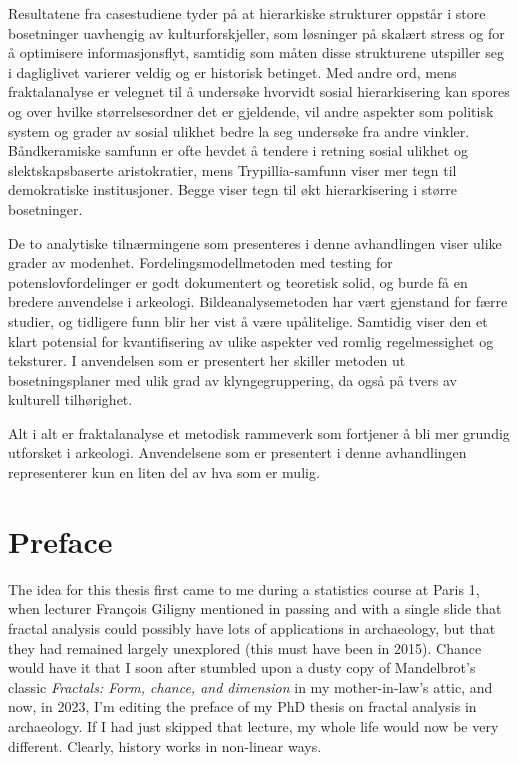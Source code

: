 \documentclass[
  12pt,
  a4paper, twoside]{book}
\begin{document}
Resultatene fra casestudiene tyder på at hierarkiske strukturer oppstår i store bosetninger uavhengig av kulturforskjeller, som løsninger på skalært stress og for å optimisere informasjonsflyt, samtidig som måten disse strukturene utspiller seg i dagliglivet varierer veldig og er historisk betinget. Med andre ord, mens fraktalanalyse er velegnet til å undersøke hvorvidt sosial hierarkisering kan spores og over hvilke størrelsesordner det er gjeldende, vil andre aspekter som politisk system og grader av sosial ulikhet bedre la seg undersøke fra andre vinkler. Båndkeramiske samfunn er ofte hevdet å tendere i retning sosial ulikhet og slektskapsbaserte aristokratier, mens Trypillia-samfunn viser mer tegn til demokratiske institusjoner. Begge viser tegn til økt hierarkisering i større bosetninger.

De to analytiske tilnærmingene som presenteres i denne avhandlingen viser ulike grader av modenhet. Fordelingsmodellmetoden med testing for potenslovfordelinger er godt dokumentert og teoretisk solid, og burde få en bredere anvendelse i arkeologi. Bildeanalysemetoden har vært gjenstand for færre studier, og tidligere funn blir her vist å være upålitelige. Samtidig viser den et klart potensial for kvantifisering av ulike aspekter ved romlig regelmessighet og teksturer. I anvendelsen som er presentert her skiller metoden ut bosetningsplaner med ulik grad av klyngegruppering, da også på tvers av kulturell tilhørighet.

Alt i alt er fraktalanalyse et metodisk rammeverk som fortjener å bli mer grundig utforsket i arkeologi. Anvendelsene som er presentert i denne avhandlingen representerer kun en liten del av hva som er mulig.

\hypertarget{preface}{%
\chapter*{Preface}\label{preface}}

The idea for this thesis first came to me during a statistics course at Paris 1, when lecturer François Giligny mentioned in passing and with a single slide that fractal analysis could possibly have lots of applications in archaeology, but that they had remained largely unexplored (this must have been in 2015). Chance would have it that I soon after stumbled upon a dusty copy of Mandelbrot's classic \emph{Fractals: Form, chance, and dimension} in my mother-in-law's attic, and now, in 2023, I'm editing the preface of my PhD thesis on fractal analysis in archaeology. If I had just skipped that lecture, my whole life would now be very different. Clearly, history works in non-linear ways.
\end{document}
